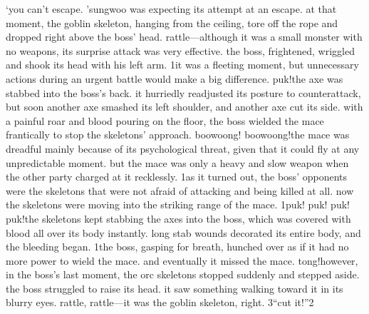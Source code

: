 ‘you can’t escape.
’sungwoo was expecting its attempt at an escape.
 at that moment, the goblin skeleton, hanging from the ceiling, tore off the rope and dropped right above the boss’ head.
rattle—although it was a small monster with no weapons, its surprise attack was very effective.
the boss, frightened, wriggled and shook its head with his left arm.
1it was a fleeting moment, but unnecessary actions during an urgent battle would make a big difference.
puk!the axe was stabbed into the boss’s back.
 it hurriedly readjusted its posture to counterattack, but soon another axe smashed its left shoulder, and another axe cut its side.
with a painful roar and blood pouring on the floor, the boss wielded the mace frantically to stop the skeletons’ approach.
boowoong! boowoong!the mace was dreadful mainly because of its psychological threat, given that it could fly at any unpredictable moment.
 but the mace was only a heavy and slow weapon when the other party charged at it recklessly.
1as it turned out, the boss’ opponents were the skeletons that were not afraid of attacking and being killed at all.
 now the skeletons were moving into the striking range of the mace.
1puk! puk! puk! puk!the skeletons kept stabbing the axes into the boss, which was covered with blood all over its body instantly.
 long stab wounds decorated its entire body, and the bleeding began.
1the boss, gasping for breath, hunched over as if it had no more power to wield the mace.
 and eventually it missed the mace.
tong!however, in the boss’s last moment, the orc skeletons stopped suddenly and stepped aside.
the boss struggled to raise its head.
 it saw something walking toward it in its blurry eyes.
 rattle, rattle—it was the goblin skeleton, right.
3“cut it!”2

 